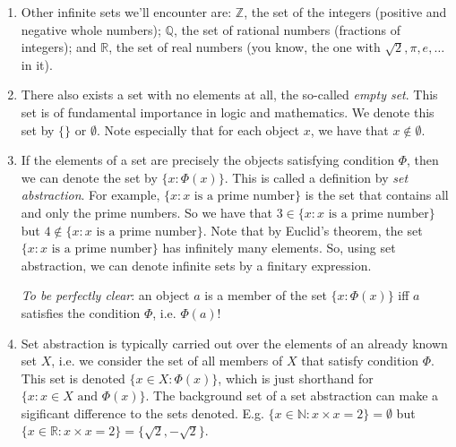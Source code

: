 \begin{enumerate}[{\thesection}.1]
	\item Other infinite sets we'll encounter are: $\mathbb{Z}$, the set of the integers (positive and negative whole numbers); $\mathbb{Q}$, the set of rational numbers (fractions of integers); and $\mathbb{R}$, the set of real numbers (you know, the one with $\sqrt 2,\pi,e, \dots$ in it). 
	
	\item There also exists a set with no elements at all, the so-called \emph{empty set}. This set is of fundamental importance in logic and mathematics. We denote this set by $\{\}$ or $\emptyset$. Note especially that for each object $x$, we have that $x\notin \emptyset$. 
		
	\item If the elements of a set are precisely the objects satisfying condition $\Phi$, then we can denote the set by $\{x:\Phi(x)\}$. This is called a definition by \emph{set abstraction}. For example, $\{x:x\text{ is a prime number}\}$ is the set that contains all and only the prime numbers. So we have that $3\in \{x:x\text{ is a prime number}\}$ but $4\notin \{x:x\text{ is a prime number}\}$. Note that by Euclid's theorem, the set $\{x:x\text{ is a prime number}\}$ has infinitely many elements. So, using set abstraction, we can denote infinite sets by a finitary expression.
	
	 \emph{To be perfectly clear}: an object $a$ is a member of the set $\{x:\Phi(x)\}$ iff $a$ satisfies the condition $\Phi$, i.e. $\Phi(a)$!
	 
	
	\item Set abstraction is typically carried out over the elements of an already known set $X$, i.e. we consider the set of all members of $X$ that satisfy condition $\Phi$. This set is denoted $\{x\in X: \Phi(x)\}$, which is just shorthand for $\{x: x\in X\text{ and }\Phi(x)\}$. The background set of a set abstraction can make a sigificant difference to the sets denoted. E.g. $\{x\in \mathbb{N}: x\times x=2\}=\emptyset$ but $\{x\in\mathbb{R}:x\times x=2\}=\{\sqrt 2, -\sqrt 2\}$.
	

\end{enumerate}
